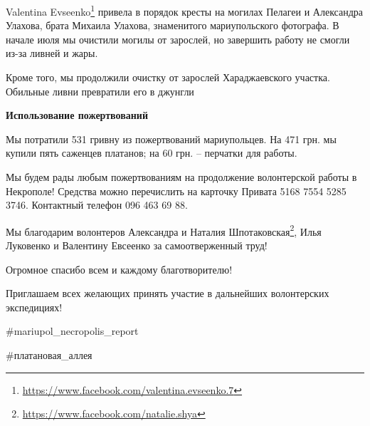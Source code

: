 Valentina
Evseenko\footnote{\url{https://www.facebook.com/valentina.evseenko.7}} привела
в порядок кресты на могилах Пелагеи и Александра Улахова, брата Михаила
Улахова, знаменитого мариупольского фотографа. В начале июля мы очистили могилы
от зарослей, но завершить работу не смогли из-за ливней и жары.

Кроме того, мы продолжили очистку от зарослей Хараджаевского участка. Обильные
ливни превратили его в джунгли 🙁

\textbf{Использование пожертвований}

Мы потратили 531 гривну из пожертвований мариупольцев. На 471 грн. мы купили пять саженцев платанов; на 60 грн. – перчатки для работы.

Мы будем рады любым пожертвованиям на продолжение волонтерской работы в
Некрополе! Средства можно перечислить на карточку Привата 5168 7554 5285 3746.
Контактный телефон 096 463 69 88.

Мы благодарим волонтеров Александра и Наталия Шпотаковская\footnote{\url{https://www.facebook.com/natalie.shya}}, Илья Луковенко и
Валентину Евсеенко за самоотверженный труд!

Огромное спасибо всем и каждому благотворителю!

Приглашаем всех желающих принять участие в дальнейших волонтерских экспедициях!

\#mariupol\_necropolis\_report

\#платановая\_аллея

